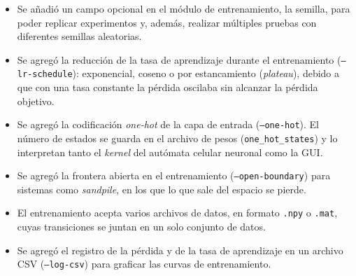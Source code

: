 \begin{itemize}
	\item Se añadió un campo opcional en el módulo de entrenamiento, la semilla, para poder replicar experimentos y, además, realizar múltiples pruebas con diferentes semillas aleatorias.
	\item Se agregó la reducción de la tasa de aprendizaje durante el entrenamiento (\texttt{--lr-schedule}): exponencial, coseno o por estancamiento (\textit{plateau}), debido a que con una tasa constante la pérdida oscilaba sin alcanzar la pérdida objetivo.
	\item Se agregó la codificación \textit{one-hot} de la capa de entrada (\texttt{--one-hot}). El número de estados se guarda en el archivo de pesos (\texttt{one\_hot\_states}) y lo interpretan tanto el \textit{kernel} del autómata celular neuronal como la GUI.
	\item Se agregó la frontera abierta en el entrenamiento (\texttt{--open-boundary}) para sistemas como \textit{sandpile}, en los que lo que sale del espacio se pierde.
	\item El entrenamiento acepta varios archivos de datos, en formato \texttt{.npy} o \texttt{.mat}, cuyas transiciones se juntan en un solo conjunto de datos.
	\item Se agregó el registro de la pérdida y de la tasa de aprendizaje en un archivo CSV (\texttt{--log-csv}) para graficar las curvas de entrenamiento.
\end{itemize}